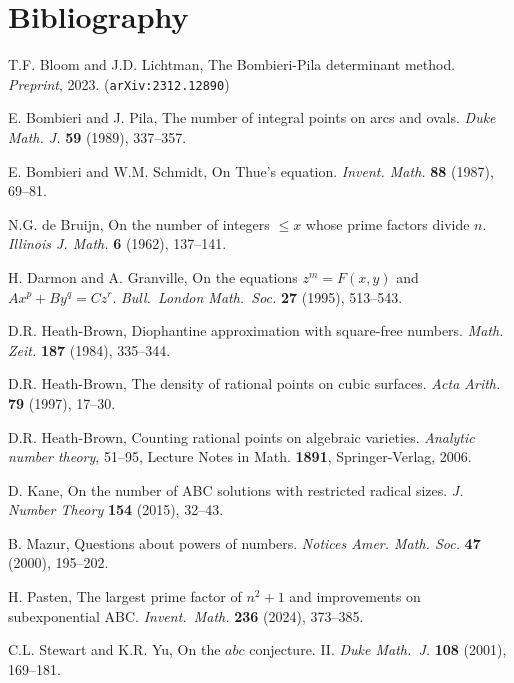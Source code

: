 \chapter{Bibliography}
\begin{thebibliography}{99}

T.F. Bloom and J.D. Lichtman, The Bombieri-Pila determinant method. {\em Preprint}, 2023. ({\tt arXiv:2312.12890})

E. Bombieri and J. Pila, The number of integral points on arcs and ovals. {\em Duke Math. J.} {\bf 59} (1989), 337--357.

E. Bombieri and W.M. Schmidt, On Thue's equation. {\em Invent. Math.} {\bf 88} (1987), 69--81.

N.G. de Bruijn, On the number of integers {$\leq x$} whose prime factors divide {$n$}.  {\em Illinois J. Math.} {\bf 6} (1962), {137--141}.

H. Darmon and A. Granville, On the equations $z^m=F(x,y)$ and $Ax^p+By^q=Cz^r$. {\em Bull.\ London Math.\ Soc.} {\bf 27} (1995), 513--543.

D.R. Heath-Brown, Diophantine approximation with square-free numbers.  {\em Math. Zeit.} {\bf 187} (1984), {335--344}.

D.R. Heath-Brown, The density of rational points on cubic surfaces. {\em Acta Arith.} {\bf 79} (1997), 17--30.

D.R. Heath-Brown, Counting rational points on algebraic varieties. {\em Analytic number theory}, 51--95, Lecture Notes in Math. {\bf 1891}, Springer-Verlag, 2006.

D. Kane, On the number of ABC solutions with restricted radical sizes. {\em J. Number Theory} {\bf 154} (2015), 32--43.

B. Mazur, Questions about powers of numbers. {\em Notices Amer. Math. Soc.} {\bf 47} (2000), 195--202.

H. Pasten, The largest prime factor of $n^2+1$ and improvements on subexponential ABC. {\em Invent.\ Math.} {\bf 236} (2024), 373--385.

C.L. Stewart and K.R. Yu, On the $abc$ conjecture. II. {\it Duke Math.\ J.} {\bf 108} (2001), 169--181.

\end{thebibliography}
